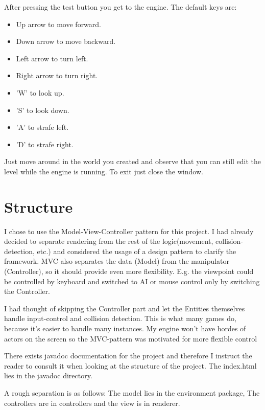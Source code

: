 \documentclass[a4paper,10pt]{article}
\begin{document}
After pressing the test button you get to the engine. The default keys are:

\begin{itemize}
 \item Up arrow to move forward.
\item Down arrow to move backward.
\item Left arrow to turn left.
\item Right arrow to turn right.
\item 'W' to look up.
\item 'S' to look down.
\item 'A' to strafe left.
\item 'D' to strafe right.
\end{itemize}

Just move around in the world you created and observe that you can still edit
the level while the engine is running. To exit just close the window.

\section{Structure}

I chose to use the Model-View-Controller pattern for this project. I had already
decided to separate rendering from the rest of the logic(movement,
collision-detection, etc.) and considered the usage of a design pattern to
clarify the framework. MVC also separates the data (Model) from the manipulator
(Controller), so it should provide even more flexibility. E.g. the viewpoint
could be controlled by keyboard and switched to AI or mouse control only by
switching the Controller.

I had thought of skipping the Controller part and let the Entities themselves
handle input-control and collision detection. This is what many games do,
because it's easier to handle many instances. My engine won't have hordes of
actors on the screen so the MVC-pattern was motivated for more flexible control

There exists javadoc documentation for the project and therefore I instruct the
reader to consult it when looking at the structure of the project. The
index.html lies in the javadoc directory.

A rough separation is as follows: The model lies in the environment package,
The controllers are in controllers and the view is in renderer.
\end{document}
